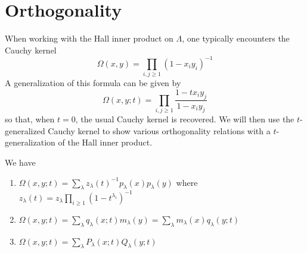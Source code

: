 \documentclass[11pt,leqno,oneside]{amsart}
\numberwithin{thm}{section}
\newcommand{\sym}{\Lambda}
\begin{document}
\section{Orthogonality}
When working with the Hall inner product on \(\sym\), one typically
encounters the Cauchy kernel \[
  \Omega(x,y) = \prod_{i,j \geq 1} (1-x_i y_i)^{-1}
\]
A generalization of this formula can be given by \[
  \Omega(x,y;t) = \prod_{i,j \geq 1} \frac{1-t x_i y_j}{1-x_i y_j}
\]
so that, when \(t=0\), the usual Cauchy kernel is recovered. We will
then use the \(t\)-generalized Cauchy kernel to show various
orthogonality relations with a \(t\)-generalization of the Hall inner
product. 
\begin{thm}\label{cauchy-sums}
  We have
  \begin{enumerate}
  \item \(\Omega(x,y;t) = \sum_\lambda z_\lambda(t)^{-1} p_\lambda(x)
    p_\lambda(y)\) where \(z_\lambda(t) = z_\lambda \prod_{i \geq 1}
    (1-t^{\lambda_i})^{-1}\)
  \item \(\Omega(x,y;t) = \sum_{\lambda} q_\lambda(x;t) m_\lambda(y) =
    \sum_{\lambda} m_\lambda(x) q_\lambda(y;t)\)
  \item \(\Omega(x,y;t) = \sum_{\lambda} P_\lambda(x;t) Q_\lambda(y;t)\)
  \end{enumerate}
\end{thm}
\end{document}
